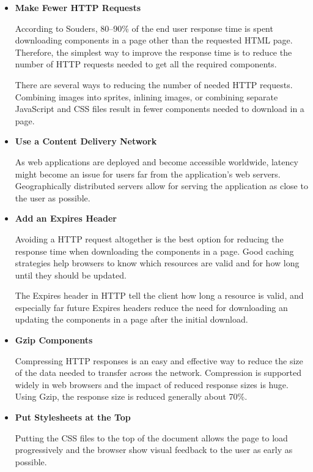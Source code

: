 \begin{itemize}


\item \textbf{Make Fewer HTTP Requests}

  According to Souders, 80--90\% of the end user response time is
  spent downloading components in a page other than the requested HTML
  page. Therefore, the simplest way to improve the response time is to
  reduce the number of HTTP requests needed to get all the required
  components.

  There are several ways to reducing the number of needed HTTP
  requests. Combining images into sprites, inlining images, or
  combining separate JavaScript and CSS files result in fewer
  components needed to download in a page.

\item \textbf{Use a Content Delivery Network}

  As web applications are deployed and become accessible worldwide,
  latency might become an issue for users far from the application's
  web servers. Geographically distributed servers allow for serving
  the application as close to the user as possible.

\item \textbf{Add an Expires Header}

  Avoiding a HTTP request altogether is the best option for reducing
  the response time when downloading the components in a page. Good
  caching strategies help browsers to know which resources are valid
  and for how long until they should be updated.

  The Expires header in HTTP tell the client how long a resource is
  valid, and especially far future Expires headers reduce the need for
  downloading an updating the components in a page after the initial
  download.

\item \textbf{Gzip Components}

  Compressing HTTP responses is an easy and effective way to reduce
  the size of the data needed to transfer across the
  network. Compression is supported widely in web browsers and the
  impact of reduced response sizes is huge. Using Gzip, the response
  size is reduced generally about 70\%.

\item \textbf{Put Stylesheets at the Top}

  Putting the CSS files to the top of the document allows the page to
  load progressively and the browser show visual feedback to the user
  as early as possible.


\end{itemize}
